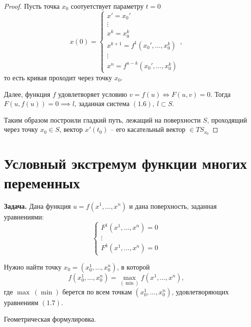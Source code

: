 \documentclass{report}
\theoremstyle{definition}
\begin{document}
\begin{proof}
  Пусть точка $x_0$ соотуетствует параметру $t = 0$
  \begin{equation*}
    x(0) = \left\{\begin{array}{l}
      x' = x_0'                        \\
      \vdots                           \\
      x^k = x_0^k                      \\
      x^{k+1} = f^1(x_0',\ldots,x_0^k) \\
      \vdots                           \\
      x^n = f^{n-k}(x_0', \ldots, x_0^k)
    \end{array}\right.,
  \end{equation*}
  то есть кривая проходит через точку $x_0$.

  Далее, функция $f$ удовлетворяет условию $v = f(u) \iff F(u,v) = 0$. Тогда $F(u,f(u)) = 0\implies l$, заданная система $(1.6), \ l \subset S$.

  Таким образом построили гладкий путь, лежащий на поверхности $S$, проходящий через точку $x_0 \in S$, вектор $x'(t_0)$ -- его касательный вектор $\in TS_{x_0}$
\end{proof}

\section{Условный экстремум функции многих переменных}

\textbf{Задача.} Дана функция $u = f(x^1,\ldots,x^n)$ и дана поверхность, заданная уравнениями:
\begin{equation}
  \left\{\begin{array}{l}
    F^1(x^1,\ldots,x^n) = 0 \\
    \vdots                  \\
    F^k(x^1,\ldots,x^n) = 0
  \end{array}\right.
\end{equation}

Нужно найти точку $x_0 = (x_0^1,\ldots,x_0^n)$, в которой
\begin{equation*}
  f(x_0^1,\ldots,x_0^n) = \underset{(\min)}{\max}f(x^1,\ldots,x^n),
\end{equation*}
где $\max \ (\min)$ берется по всем точкам $(x_0^1,\ldots,x_0^n)$, удовлетворяющих уравнениям $(1.7)$.

\begin{center}
  {\large Геометрическая формулировка.}
\end{center}
\end{document}
